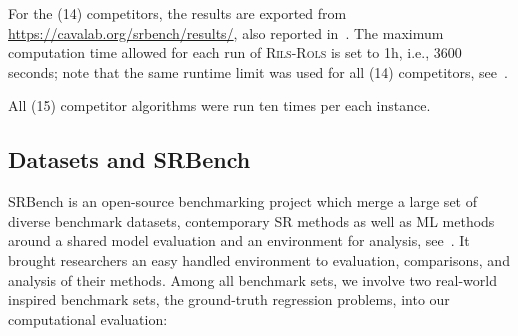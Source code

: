 \documentclass[a4paper,12pt]{elsarticle}
\begin{document}
For the (14) competitors, the results are exported from \url{https://cavalab.org/srbench/results/}, also reported in~\cite{la2021contemporary}. 
The maximum computation time allowed for each run of \textsc{Rils}-\textsc{Rols} is set to 1h, i.e., 3600 seconds; note that the same runtime limit was used for all (14) competitors, see~\cite{la2021contemporary}. 


All (15) competitor algorithms were run ten times per each instance.  


\subsection{Datasets and SRBench}

SRBench is an open-source benchmarking project which merge a large set of diverse benchmark datasets, contemporary SR methods as well as ML methods around a shared model evaluation and an environment for analysis, see~\cite{la2021contemporary}. It brought researchers an easy handled environment to evaluation, comparisons, and analysis of their methods. Among all benchmark sets, we involve two real-world inspired benchmark sets, the ground-truth regression problems, into our computational evaluation: 
\end{document}
